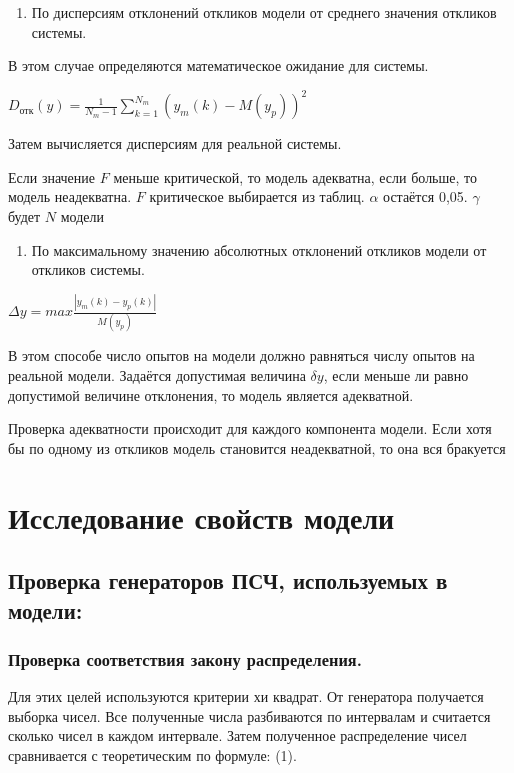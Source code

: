 \documentclass[12pt, russian, oneside, article]{ncc}
\begin{document}
\begin{enumerate}
\item По дисперсиям отклонений откликов модели от среднего значения откликов системы.
\end{enumerate}

В этом случае определяются математическое ожидание для системы.

$D_{\text{отк}}(y) = \frac{1}{N_m - 1} \sum_{k = 1}^{N_m}(y_m(k) - M(y_p))^2$

Затем вычисляется дисперсиям для реальной системы.

Если значение $F$ меньше критической, то модель адекватна, если больше, то модель неадекватна. $F$ критическое выбирается из таблиц. $\alpha$ остаётся 0,05. $\gamma$ будет $N$ модели

\begin{enumerate}
\item По максимальному значению абсолютных отклонений откликов модели от откликов системы.
\end{enumerate}

$\Delta y = max \frac{|y_m(k) - y_p(k)|}{M(y_p)}$

В этом способе число опытов на модели должно равняться числу опытов на реальной модели. Задаётся допустимая величина $\delta y$, если меньше ли равно допустимой величине отклонения, то модель является адекватной.

Проверка адекватности происходит для каждого компонента модели. Если хотя бы по одному из откликов модель становится неадекватной, то она вся бракуется
\section{Исследование свойств модели}
\label{sec-7}
\subsection{Проверка генераторов ПСЧ, используемых в модели:}
\label{sec-7_1}
\subsubsection{Проверка соответствия закону распределения.}
\label{sec-7_1_1}


Для этих целей используются критерии хи квадрат. От генератора получается выборка чисел. Все полученные числа разбиваются по интервалам и считается сколько чисел в каждом интервале. Затем полученное распределение чисел сравнивается с теоретическим по формуле: (1).
\end{document}
